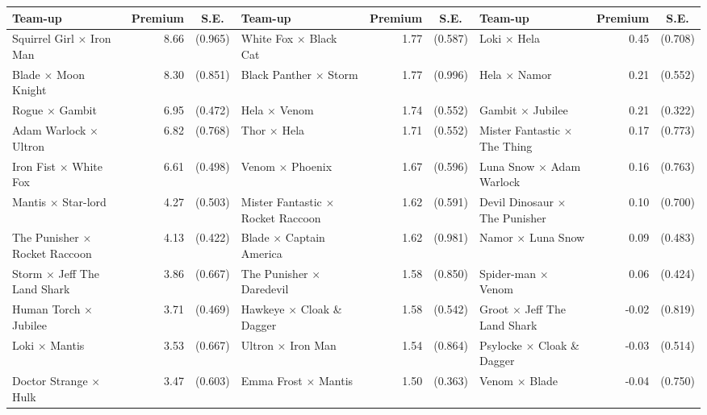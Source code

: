 \documentclass[11pt]{article}
\renewcommand{\arraystretch}{1.05}
\begin{document}
\begin{landscape}
\begin{center}
{\scriptsize\setlength{\tabcolsep}{3.5pt}\renewcommand{\arraystretch}{1.0}
\label{tab:teamups}
\begin{tabular}{l r r @{\hspace{1.4em}} l r r @{\hspace{1.4em}} l r r}
\toprule
Team-up & \multicolumn{1}{c}{Premium} & \multicolumn{1}{c}{S.E.} & Team-up & \multicolumn{1}{c}{Premium} & \multicolumn{1}{c}{S.E.} & Team-up & \multicolumn{1}{c}{Premium} & \multicolumn{1}{c}{S.E.} \\
\midrule
Squirrel Girl $\times$ Iron Man & 8.66 & (0.965) & White Fox $\times$ Black Cat & 1.77 & (0.587) & Loki $\times$ Hela & 0.45 & (0.708) \\
Blade $\times$ Moon Knight & 8.30 & (0.851) & Black Panther $\times$ Storm & 1.77 & (0.996) & Hela $\times$ Namor & 0.21 & (0.552) \\
Rogue $\times$ Gambit & 6.95 & (0.472) & Hela $\times$ Venom & 1.74 & (0.552) & Gambit $\times$ Jubilee & 0.21 & (0.322) \\
Adam Warlock $\times$ Ultron & 6.82 & (0.768) & Thor $\times$ Hela & 1.71 & (0.552) & Mister Fantastic $\times$ The Thing & 0.17 & (0.773) \\
Iron Fist $\times$ White Fox & 6.61 & (0.498) & Venom $\times$ Phoenix & 1.67 & (0.596) & Luna Snow $\times$ Adam Warlock & 0.16 & (0.763) \\
Mantis $\times$ Star-lord & 4.27 & (0.503) & Mister Fantastic $\times$ Rocket Raccoon & 1.62 & (0.591) & Devil Dinosaur $\times$ The Punisher & 0.10 & (0.700) \\
The Punisher $\times$ Rocket Raccoon & 4.13 & (0.422) & Blade $\times$ Captain America & 1.62 & (0.981) & Namor $\times$ Luna Snow & 0.09 & (0.483) \\
Storm $\times$ Jeff The Land Shark & 3.86 & (0.667) & The Punisher $\times$ Daredevil & 1.58 & (0.850) & Spider-man $\times$ Venom & 0.06 & (0.424) \\
Human Torch $\times$ Jubilee & 3.71 & (0.469) & Hawkeye $\times$ Cloak \& Dagger & 1.58 & (0.542) & Groot $\times$ Jeff The Land Shark & -0.02 & (0.819) \\
Loki $\times$ Mantis & 3.53 & (0.667) & Ultron $\times$ Iron Man & 1.54 & (0.864) & Psylocke $\times$ Cloak \& Dagger & -0.03 & (0.514) \\
Doctor Strange $\times$ Hulk & 3.47 & (0.603) & Emma Frost $\times$ Mantis & 1.50 & (0.363) & Venom $\times$ Blade & -0.04 & (0.750) \\

\end{tabular}}
\end{center}
\end{landscape}
\end{document}
